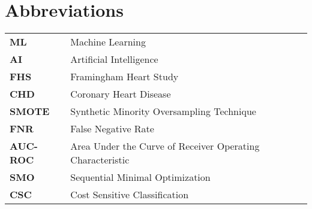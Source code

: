 \newpage
{}

\begin{abstract}


\end{abstract}
\newpage

\section*{Abbreviations}

\begin{tabular}{ll}
\textbf{ML}       & Machine Learning \\
\textbf{AI}       & Artificial Intelligence \\
\textbf{FHS}      & Framingham Heart Study \\
\textbf{CHD}      & Coronary Heart Disease \\
\textbf{SMOTE}    & Synthetic Minority Oversampling Technique \\
\textbf{FNR}      & False Negative Rate \\
\textbf{AUC-ROC}  & Area Under the Curve of Receiver Operating Characteristic \\
\textbf{SMO}      & Sequential Minimal Optimization \\
\textbf{CSC}      & Cost Sensitive Classification \\
\end{tabular}


\listoffigures 
{}
\listoftables

\newpage

\tableofcontents

\newpage
{}